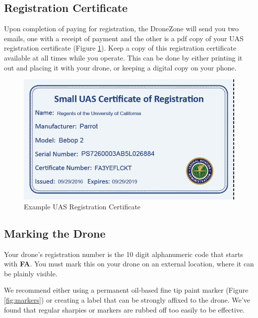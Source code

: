 \documentclass[
  12pt,
]{book}
\begin{document}
\hypertarget{registration-certificate}{%
\subsection{Registration Certificate}\label{registration-certificate}}

Upon completion of paying for registration, the DroneZone will send you two emails, one with a receipt of payment and the other is a pdf copy of your UAS registration certificate (Figure \ref{fig:reg-cert}). Keep a copy of this registration certificate available at all times while you operate. This can be done by either printing it out and placing it with your drone, or keeping a digital copy on your phone.

\begin{figure}

{\centering \includegraphics[width=0.5\linewidth]{images/reg_cert} 

}

\caption{Example UAS Registration Certificate}\label{fig:reg-cert}
\end{figure}

\hypertarget{marking-the-drone}{%
\subsection{Marking the Drone}\label{marking-the-drone}}

Your drone's registration number is the 10 digit alphanumeric code that starts with \textbf{FA}. You must mark this on your drone on an external location, where it can be plainly visible.

We recommend either using a permanent oil-based fine tip paint marker (Figure \ref{fig:markers}) or creating a label that can be strongly affixed to the drone. We've found that regular sharpies or markers are rubbed off too easily to be effective.
\end{document}
